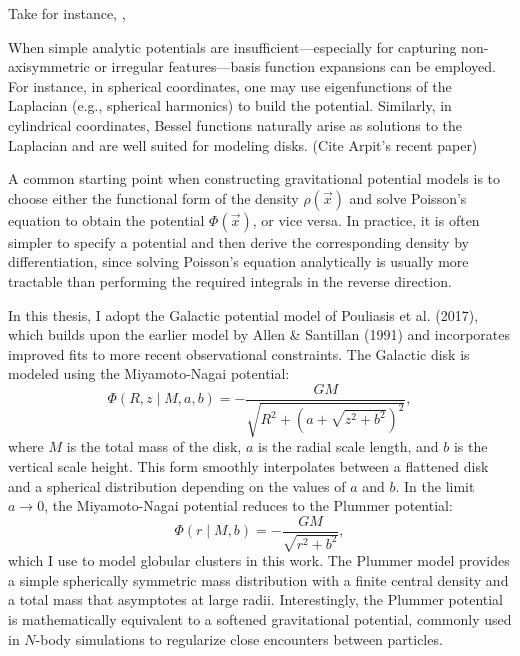         
        Take for instance, \citep{2017MNRAS.465...76M}, 


        When simple analytic potentials are insufficient—especially for capturing non-axisymmetric or irregular features—basis function expansions can be employed. For instance, in spherical coordinates, one may use eigenfunctions of the Laplacian (e.g., spherical harmonics) to build the potential. Similarly, in cylindrical coordinates, Bessel functions naturally arise as solutions to the Laplacian and are well suited for modeling disks. (Cite Arpit's recent paper)



        A common starting point when constructing gravitational potential models is to choose either the functional form of the density $\rho(\vec{x})$ and solve Poisson's equation to obtain the potential $\Phi(\vec{x})$, or vice versa. In practice, it is often simpler to specify a potential and then derive the corresponding density by differentiation, since solving Poisson's equation analytically is usually more tractable than performing the required integrals in the reverse direction.

        In this thesis, I adopt the Galactic potential model of Pouliasis et al. (2017), which builds upon the earlier model by Allen \& Santillan (1991) and incorporates improved fits to more recent observational constraints. The Galactic disk is modeled using the Miyamoto-Nagai potential:
        \begin{equation}
            \Phi(R, z \mid M, a, b) = -\frac{G M}{\sqrt{R^2 + \left(a + \sqrt{z^2 + b^2}\right)^2}},
        \end{equation}
        where $M$ is the total mass of the disk, $a$ is the radial scale length, and $b$ is the vertical scale height. This form smoothly interpolates between a flattened disk and a spherical distribution depending on the values of $a$ and $b$. In the limit $a \to 0$, the Miyamoto-Nagai potential reduces to the Plummer potential:
        \begin{equation}
            \Phi(r \mid M, b) = -\frac{G M}{\sqrt{r^2 + b^2}},
        \end{equation}
        which I use to model globular clusters in this work. The Plummer model provides a simple spherically symmetric mass distribution with a finite central density and a total mass that asymptotes at large radii. Interestingly, the Plummer potential is mathematically equivalent to a softened gravitational potential, commonly used in $N$-body simulations to regularize close encounters between particles.


